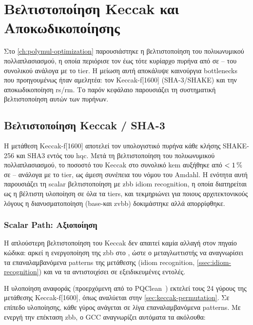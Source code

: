 \chapter{Βελτιστοποίηση Keccak και Αποκωδικοποίησης}
\label{ch:kernel-optimization}

Στο \cref{ch:polymul-optimization} παρουσιάστηκε η βελτιστοποίηση του
πολυωνυμικού πολλαπλασιασμού, η οποία περιόρισε τον έως τότε κυρίαρχο
πυρήνα από  σε – του συνολικού \instret ανάλογα
με το tier. Η μείωση αυτή αποκάλυψε καινούργια bottlenecks που προηγουμένως 
ήταν αμελητέα: τον Keccak-f[1600]
(SHA-3/SHAKE) και την αποκωδικοποίηση \gls{rs}/\gls{rm}. Το παρόν κεφάλαιο
παρουσιάζει τη συστηματική βελτιστοποίηση αυτών των πυρήνων.

\section{Βελτιστοποίηση Keccak / SHA-3}
\label{sec:keccak-optimization}

Η μετάθεση Keccak-f[1600] αποτελεί τον υπολογιστικό πυρήνα κάθε κλήσης
SHAKE-256 και SHA3 εντός του \gls{hqc}. Μετά τη βελτιστοποίηση του πολυωνυμικού
πολλαπλασιασμού, το ποσοστό του Keccak στο συνολικό \gls{kem} \instret αυξήθηκε
από $<\SI{1}{\percent}$ σε – ανάλογα με το tier, ως άμεση συνέπεια
του νόμου του Amdahl. Η ενότητα αυτή παρουσιάζει τη scalar βελτιστοποίηση με 
\gls{zbb} idiom recognition, η οποία διατηρείται ως η βέλτιστη υλοποίηση σε 
όλα τα tiers, και τεκμηριώνει για ποιους αρχιτεκτονικούς λόγους η διανυσματοποίηση
(base-\RVV και \gls{zvbb}) δοκιμάστηκε αλλά απορρίφθηκε.

\subsection{Scalar Path: Αξιοποίηση \Zbb}
\label{ssec:keccak-scalar-zbb}

Η απλούστερη βελτιστοποίηση του Keccak δεν απαιτεί καμία αλλαγή στον
πηγαίο κώδικα: αρκεί η ενεργοποίηση της \gls{zbb} στο , ώστε ο μεταγλωττιστής
να αναγνωρίσει τα επαναλαμβανόμενα patterns της μετάθεσης (idiom recognition,
\cref{ssec:idiom-recognition}) και να τα αντιστοιχίσει σε εξειδικευμένες εντολές.

Η υλοποίηση αναφοράς (προερχόμενη από το PQClean~\cite{pqclean2022})
εκτελεί τους \num{24} γύρους της μετάθεσης Keccak-f[1600], όπως αναλύεται
στην \cref{sec:keccak-permutation}. Σε επίπεδο υλοποίησης, κάθε γύρος ανάγεται σε λίγα επαναλαμβανόμενα patterns.
Με ενεργή την επέκταση \gls{zbb}, ο GCC αναγνωρίζει αυτόματα τα ακόλουθα:

